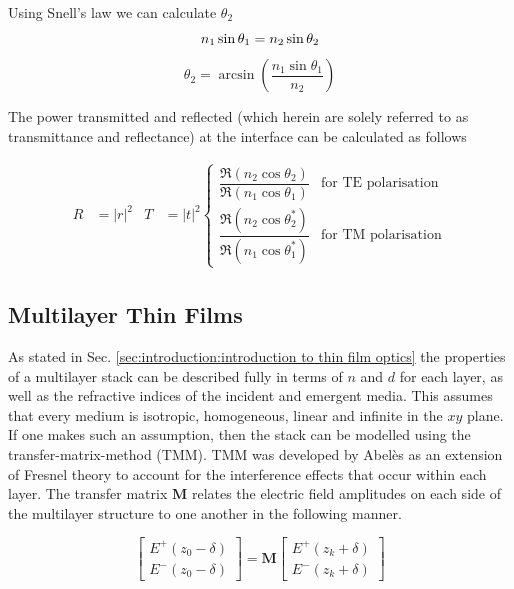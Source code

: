 \documentclass[10pt,a4paper,portrait]{report}
\begin{document}
\noindent
Using Snell's law we can calculate $\theta_2$
\begin{equation}\label{eq:snells law}
n_1 \sin \theta_1 = n_2 \sin \theta_2 \notag
\end{equation}
\begin{equation}
\theta_2 = \arcsin \left( \frac{n_1 \sin \theta_1 }{ n_2 } \right)
\end{equation}

\noindent
The power transmitted and reflected (which herein are solely referred to as transmittance and reflectance) at the interface can be calculated as follows

\begin{align}\label{eq:power-equations}
R &= |r|^2 &
T &= |t|^2
\begin{cases}
\dfrac{\Re \left( n_2 \cos\theta_2 \right)}{\Re \left( n_1 \cos\theta_1  \right)} & \mbox{for TE polarisation}\\[5mm]
\dfrac{\Re \left( n_2 \cos\theta_2^* \right)}{\Re \left( n_1 \cos\theta_1^* \right)} & \mbox{for TM polarisation}
\end{cases}
\end{align}

\subsection{Multilayer Thin Films}
As stated in Sec. \ref{sec:introduction:introduction to thin film optics} the properties of a multilayer stack can be described fully in terms of $n$ and $d$ for each layer, as well as the refractive indices of the incident and emergent media.
This assumes that every medium is isotropic, homogeneous, linear and infinite in the $xy$ plane.
If one makes such an assumption, then the stack can be modelled using the transfer-matrix-method (TMM). 
TMM was developed by Abel\`es \cite{abeles_sur_1948} \cite{abeles_theorie_1950} as an extension of Fresnel theory to account for the interference effects that occur within each layer.
The transfer matrix $\mathbf{M}$ relates the electric field amplitudes on each side of the multilayer structure to one another in the following manner.

\begin{equation}\label{eq:transfer-matrix-definition}
\begin{bmatrix}
  E^+\left( z_0 - \delta \right) \\
  E^-\left( z_0 - \delta \right)
\end{bmatrix} =
\mathbf{M}
\begin{bmatrix}
  E^+\left( z_k + \delta \right) \\
  E^-\left( z_k + \delta \right)
\end{bmatrix}
\end{equation}
\end{document}
